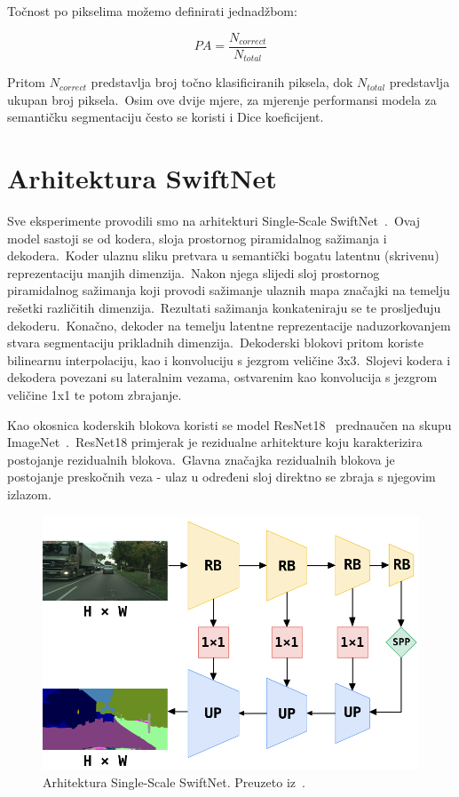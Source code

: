 \documentclass[times, utf8, seminar, numeric]{fer}
\begin{document}
Točnost po pikselima možemo definirati jednadžbom:

\begin{equation}
    PA = \frac{N_{correct}}{N_{total}}
    \label{eq:pa}
\end{equation}

Pritom $N_{correct}$ predstavlja broj točno klasificiranih piksela, dok $N_{total}$ predstavlja ukupan broj piksela.\ 
Osim ove dvije mjere, za mjerenje performansi modela za semantičku segmentaciju često se koristi i Dice koeficijent.

\section{Arhitektura SwiftNet}

Sve eksperimente provodili smo na arhitekturi Single-Scale SwiftNet~\cite{orvsic2021efficient}.\ Ovaj model sastoji se od kodera, sloja prostornog piramidalnog sažimanja i dekodera.\ 
Koder ulaznu sliku pretvara u semantički bogatu latentnu (skrivenu) reprezentaciju manjih dimenzija.\ 
Nakon njega slijedi sloj prostornog piramidalnog sažimanja koji provodi sažimanje ulaznih mapa značajki na temelju rešetki različitih dimenzija.\ Rezultati sažimanja konkateniraju se te prosljeđuju dekoderu.\
Konačno, dekoder na temelju latentne reprezentacije naduzorkovanjem stvara segmentaciju prikladnih dimenzija.\
Dekoderski blokovi pritom koriste bilinearnu interpolaciju, kao i konvoluciju s jezgrom veličine 3x3.\
Slojevi kodera i dekodera povezani su lateralnim vezama, ostvarenim kao konvolucija s jezgrom veličine 1x1 te potom zbrajanje.\
  
Kao okosnica koderskih blokova koristi se model ResNet18~\cite{he2016deep} prednaučen na skupu ImageNet~\cite{deng2009imagenet}.\ 
ResNet18 primjerak je rezidualne arhitekture koju karakterizira postojanje rezidualnih blokova.\ 
Glavna značajka rezidualnih blokova je postojanje preskočnih veza - ulaz u određeni sloj direktno se zbraja s njegovim izlazom.\

\begin{figure}[htb]
    \centering
    \includegraphics[scale=0.425]{./Slike/swiftnet.png}
    \caption{Arhitektura Single-Scale SwiftNet. Preuzeto iz~\cite{orvsic2021efficient}.}
    \label{fig:swiftnet}
\end{figure}
\end{document}
